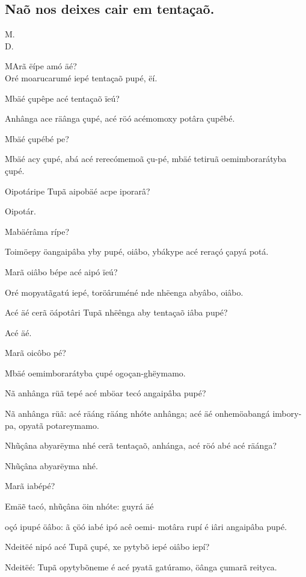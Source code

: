 \documentclass[openany,titlepage,12pt]{book}
\newcommand{\comecalista}[5]{
    \hspace*{-11.7pt}
    \begin{minipage}[t]{0.08\linewidth}
        \flushright #1\\#2
    \end{minipage}
    \hspace{0pt}
    \begin{minipage}[t]{0.94\linewidth}
        \lettrine
        [findent =2pt, nindent=0pt,  lines=2]
        {#3}{#4}#5
    \end{minipage}
    \vspace*{-3pt}
}
\begin{document}
\subsection{Naõ nos deixes cair em tentaçaõ.}
\unskip\vspace*{-0.7\baselineskip}
\comecalista{M.}{D.}{M}{A}
{rã ëípe amó äé?\\ Oré moarucarumé iepé tentaçaõ pupé, ëí.}
\begin{alternate}
    \item Mbäé çupêpe acé tentaçaõ ïeú?
    \item Anhânga ace räânga çupé, acé röó acé\linebreak momoxy
    potâra çupêbé.
    \item Mbäé çupébé pe?
    \item Mbäé acy çupé, abá acé rerecómemoã çu-pé, mbäé
    tetiruã oemimborarátyba çupé.
    \item Oipotáripe Tupã aipobäé acpe iporarâ?
    \item Oipotár.
    \item Mabäérâma rípe?
    \item Toimöepy öangaipâba yby pupé, oiâbo, ybákype
    acé reraçó çapyá potá.
    \item Marã oiâbo bépe acé aipó ïeú?
    \item Oré mopyatãgatú iepé, toröâruméné nde nhëenga
    abyâbo, oiâbo.
    \item Acé äé cerã öápotâri Tupã nhëênga aby tentaçaõ
    iâba pupé?
    \item Acé äé.
    \item Marã oicôbo pé?
    \item Mbäé oemimborarátyba çupé ogoçan-\linebreak ghëymamo.
    \item Nã anhânga rüã tepé acé mböar tecó angaipâba pupé? 
    \item Nã anhânga rüã: acé räáng räáng nhóte anhânga;
    acé äé onhemöabangá imbory-pa, opyatã potareymamo.
    \item Nhũçâna abyarëyma nhé cerã tentaçaõ,
    anhánga, acé röó abé acé räánga?
    \item Nhũçâna abyarëyma nhé.
    \item Marã iabépé?
    \item Emäẽ tacó, nhũçâna öin nhóte: guyrá äé
\end{alternate}
\hspace*{5pt}oçó ipupé öâbo: ã çöó iabé ipó acê oemi-
\hspace*{5pt}motâra rupí é
    iâri angaipâba pupé.
\begin{alternate}
    \item Ndeitëé nipó acé Tupã çupé, xe pytybõ
    iepé oiâbo iepí?
    \item Ndeitëé: Tupã opytybõneme é acé pyatã gatúramo, 
    öânga çumarã reityca.        
\end{alternate}
\end{document}
